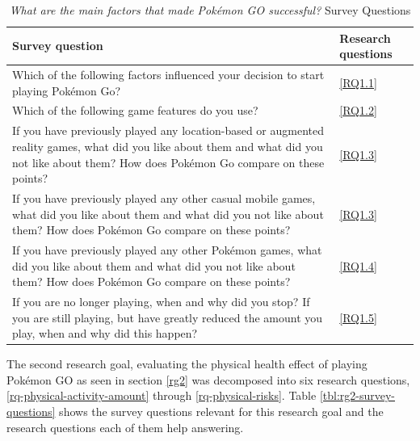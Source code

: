 \begin{table}[h]
	\caption{\emph{What are the main factors that made Pokémon GO successful?} Survey Questions}
	\centering
	\label{tbl:rg1-survey-questions}
	\begin{tabularx}{\textwidth}{|X|l|}
		\hline
		\textbf{Survey question} & \textbf{Research questions}\\
		\hline\hline
		
		Which of the following factors influenced your decision to start playing Pokémon Go? & \ref{RQ1.1}\\
		\hline
		
		Which of the following game features do you use? & \ref{RQ1.2}\\
		\hline
		
		If you have previously played any location-based or augmented reality games, what did you like about them and what did you not like about them? How does Pokémon Go compare on these points? & \ref{RQ1.3}\\
		\hline
		
		If you have previously played any other casual mobile games, what did you like about them and what did you not like about them? How does Pokémon Go compare on these points? & \ref{RQ1.3}\\
		\hline
		
		If you have previously played any other Pokémon games, what did you like about them and what did you not like about them? How does Pokémon Go compare on these points? & \ref{RQ1.4}\\
		\hline
		
		If you are no longer playing, when and why did you stop? If you are still playing, but have greatly reduced the amount you play, when and why did this happen? & \ref{RQ1.5}\\
		\hline
	\end{tabularx}
\end{table}

The second research goal, evaluating the physical health effect of playing Pokémon GO as seen in section \ref{rg2} was decomposed into six research questions, \ref{rq-physical-activity-amount} through \ref{rq-physical-risks}. Table \ref{tbl:rg2-survey-questions} shows the survey questions relevant for this research goal and the research questions each of them help answering.

